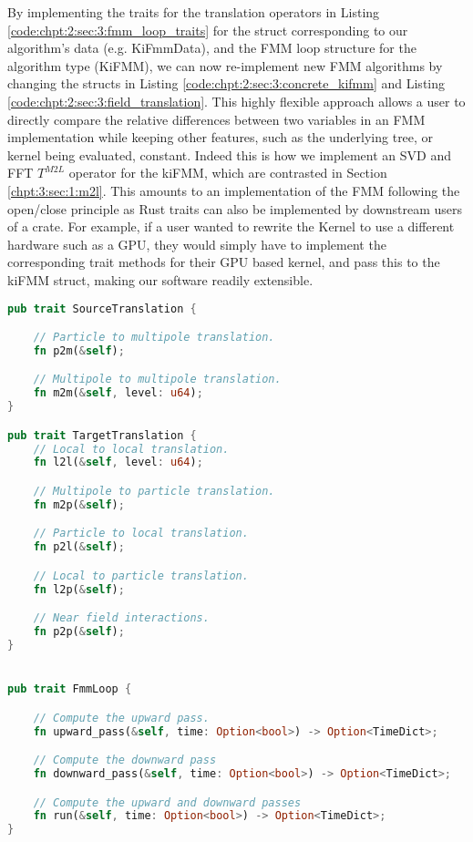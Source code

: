 By implementing the traits for the translation operators in Listing \ref{code:chpt:2:sec:3:fmm_loop_traits} for the struct corresponding to our algorithm's data (e.g. KiFmmData), and the FMM loop structure for the algorithm type (KiFMM), we can now re-implement new FMM algorithms by changing the structs in Listing \ref{code:chpt:2:sec:3:concrete_kifmm} and Listing \ref{code:chpt:2:sec:3:field_translation}. This highly flexible approach allows a user to directly compare the relative differences between two variables in an FMM implementation while keeping other features, such as the underlying tree, or kernel being evaluated, constant. Indeed this is how we implement an SVD and FFT $T^{M2L}$ operator for the kiFMM, which are contrasted in Section \ref{chpt:3:sec:1:m2l}. This amounts to an implementation of the FMM following the open/close principle as Rust traits can also be implemented by downstream users of a crate. For example, if a user wanted to rewrite the Kernel to use a different hardware such as a GPU, they would simply have to implement the corresponding trait methods for their GPU based kernel, and pass this to the kiFMM struct, making our software readily extensible.

\begin{lstlisting}[language=Rust, caption={Traits that are implemented over FMM Data structs, and FMM algorithm structs},  label=code:chpt:2:sec:3:fmm_loop_traits]
pub trait SourceTranslation {

    // Particle to multipole translation.
    fn p2m(&self);

    // Multipole to multipole translation.
    fn m2m(&self, level: u64);
}

pub trait TargetTranslation {
    // Local to local translation.
    fn l2l(&self, level: u64);

    // Multipole to particle translation.
    fn m2p(&self);

    // Particle to local translation.
    fn p2l(&self);

    // Local to particle translation.
    fn l2p(&self);

    // Near field interactions.
    fn p2p(&self);
}


pub trait FmmLoop {

    // Compute the upward pass.
    fn upward_pass(&self, time: Option<bool>) -> Option<TimeDict>;

    // Compute the downward pass
    fn downward_pass(&self, time: Option<bool>) -> Option<TimeDict>;

    // Compute the upward and downward passes
    fn run(&self, time: Option<bool>) -> Option<TimeDict>;
}
\end{lstlisting}

